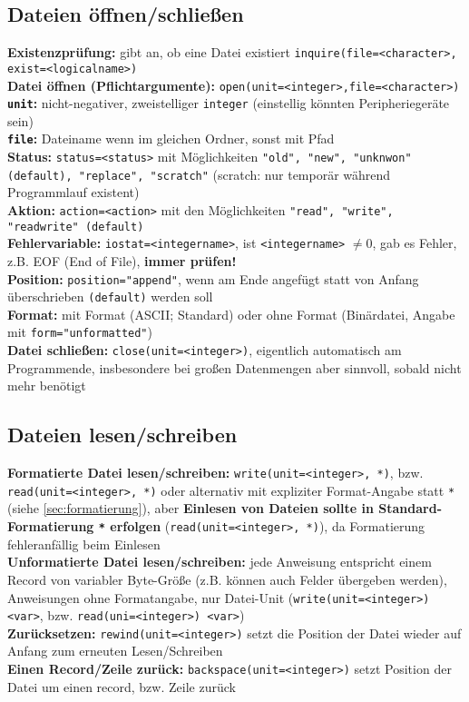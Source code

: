 \documentclass[a4paper, twocolumn]{scrarticle}
\begin{document}
\subsection{Dateien öffnen/schließen}
\textbf{Existenzprüfung:} gibt an, ob eine Datei existiert \lstinline|inquire(file=<character>, exist=<logicalname>)| \\
\textbf{Datei öffnen (Pflichtargumente):} \lstinline|open(unit=<integer>,file=<character>)|\\
\textbf{\lstinline|unit|:} nicht-negativer, zweistelliger \lstinline|integer| (einstellig könnten Peripheriegeräte sein)\\
\textbf{\lstinline|file|:} Dateiname wenn im gleichen Ordner, sonst mit Pfad\\
\textbf{Status:} \lstinline|status=<status>| mit Möglichkeiten \lstinline|"old", "new", "unknwon" (default), "replace", "scratch"| (scratch: nur temporär während Programmlauf existent)\\
\textbf{Aktion:} \lstinline|action=<action>| mit den Möglichkeiten \lstinline|"read", "write", "readwrite" (default)|\\
\textbf{Fehlervariable:} \lstinline|iostat=<integername>|, ist \lstinline|<integername>| $\neq 0$, gab es Fehler, z.B. EOF (End of File), \textbf{immer prüfen!}\\
\textbf{Position:} \lstinline|position="append"|, wenn am Ende angefügt statt von Anfang überschrieben \lstinline|(default)| werden soll\\
\textbf{Format:} mit Format (ASCII; Standard) oder ohne Format (Binärdatei, Angabe mit \lstinline|form="unformatted"|)\\
\textbf{Datei schließen:} \lstinline|close(unit=<integer>)|, eigentlich automatisch am Programmende, insbesondere bei großen Datenmengen aber sinnvoll, sobald nicht mehr benötigt

\subsection{Dateien lesen/schreiben}
\textbf{Formatierte Datei lesen/schreiben:} \lstinline|write(unit=<integer>, *)|, bzw. \lstinline|read(unit=<integer>, *)| oder alternativ mit expliziter Format-Angabe statt \lstinline|*| (siehe \cref{sec:formatierung}), aber
\textbf{Einlesen von Dateien sollte in Standard-Formatierung \lstinline|*| erfolgen} (\lstinline|read(unit=<integer>, *)|), da Formatierung fehleranfällig beim Einlesen\\
\textbf{Unformatierte Datei lesen/schreiben:} jede Anweisung entspricht einem Record von variabler Byte-Größe (z.B. können auch Felder übergeben werden), Anweisungen ohne Formatangabe, nur Datei-Unit (\lstinline|write(unit=<integer>) <var>|, bzw. \lstinline|read(uni=<integer>) <var>|)\\
\textbf{Zurücksetzen:} \lstinline|rewind(unit=<integer>)| setzt die Position der Datei wieder auf Anfang zum erneuten Lesen/Schreiben\\
\textbf{Einen Record/Zeile zurück:} \lstinline|backspace(unit=<integer>)| setzt Position der Datei um einen record, bzw. Zeile zurück
\end{document}
